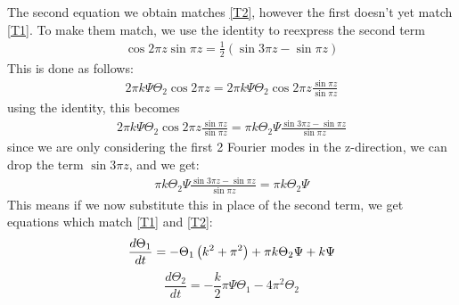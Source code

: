 \documentclass{article}
\begin{document}
The second equation we obtain matches \ref{T2}, however the first doesn't yet match \ref{T1}. To make them match, we use the identity to reexpress the second term
\begin{align*}
    \cos 2\pi z \sin \pi z = \frac{1}{2}\left(\sin 3 \pi z - \sin \pi z\right)
\end{align*}
This is done as follows:
\begin{align*}
    2 \pi k \Psi \Theta_2 \cos 2\pi z = 2 \pi k \Psi \Theta_2 \cos 2\pi z \frac{\sin \pi z}{\sin \pi z}
\end{align*}
using the identity, this becomes
\begin{align*}
    2 \pi k \Psi \Theta_2 \cos 2\pi z \frac{\sin \pi z}{\sin \pi z} = \pi k \Theta_2 \Psi \frac{\sin 3\pi z - \sin \pi z}{\sin \pi z}
\end{align*}
since we are only considering the first 2 Fourier modes in the z-direction, we can drop the term $\sin 3 \pi z$, and we get:
\begin{align*}
    \pi k \Theta_2 \Psi \frac{\sin 3\pi z - \sin \pi z}{\sin \pi z} = \pi k \Theta_2 \Psi
\end{align*}
This means if we now substitute this in place of the second term, we get equations which match \ref{T1} and \ref{T2}:
\begin{equation*}
    \frac{d\Theta_1}{dt} = -\Theta_1 \left(k^2 + \pi^2\right) + \pi k \Theta_2 \Psi + k\Psi \\
\end{equation*}
\begin{equation*}
        \frac{d\Theta_2}{dt} = -\frac{k}{2} \pi \Psi \Theta_1 - 4\pi^2 \Theta_2 
\end{equation*}
\end{document}
